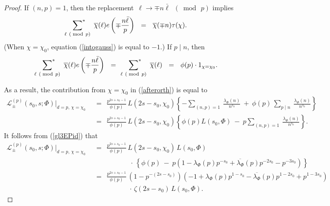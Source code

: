 \documentclass[10pt,a4paper]{amsart}
\begin{document}
\begin{proof}
	If $(n,p)=1$, then the replacement\,   $\ell \to \mp n\bar{\ell}$\, $(\bmod\, p)$ implies 
	\begin{align}\label{intogauss}
		\sideset{}{^*}{\sum}_{\ell \ (\bmod\, p)}  \ \overline{\chi}(\ell) 	e\left(\mp \frac{n\bar{\ell}}{p}\right) \ \ =  \ \  \overline{\chi}(\mp n) \tau(\chi). 
	\end{align}
 (When $\chi=\chi_{0}$, equation (\ref{intogauss}) is equal to $-1$.) If  $p\mid n$, then
	\begin{align*}
		\sideset{}{^*}{\sum}_{\ell \ (\bmod\, p)}  \ \overline{\chi}(\ell) 	e\left(\mp \frac{n\bar{\ell}}{p}\right) \ \ = \  \  	\sideset{}{^*}{\sum}_{\ell \ (\bmod\, p)}  \ \overline{\chi}(\ell)  \ \ = \ \  \phi(p)\cdot  1_{\chi=\chi_{0}}. 
	\end{align*}
	
	As a result, the contribution from $\chi=\chi_{0}$ in (\ref{afterorth}) is equal to 
	\begin{align}
			\mathcal{L}^{(p)}_{\pm}\left(s_{0}, s; \Phi\right) \bigg|_{d=p, \, \chi=\chi_{0}}   \ \ &= \  \   \frac{p^{2s+s_{0}-1}}{\phi(p)} \,  L(2s-s_{0}, \chi_{0})  \left\{ -\sum_{(n,p)=1} \ \frac{\lambda_{\Phi}(n)}{n^{s_{0}}}  \ + \ \phi(p) \, \sum_{p\mid n} \ \frac{\lambda_{\Phi}(n)}{n^{s_{0}}}   \right\} \nonumber\\
		\ \ &= \ \     \frac{p^{2s+s_{0}-1}}{\phi(p)} \,  L(2s-s_{0}, \chi_{0})  \left\{  \phi(p) L(s_{0}, \Phi) \ - \  p \sum_{(n,p)=1} \ \frac{\lambda_{\Phi}(n)}{n^{s_{0}}} \right\}. \nonumber
	\end{align}
	It follows from (\ref{gl3EPid}) that
	\begin{align}
			\mathcal{L}^{(p)}_{\pm}\left(s_{0}, s; \Phi\right) \bigg|_{d=p, \, \chi=\chi_{0}} 	\ \ &= \  \     \frac{p^{2s+s_{0}-1}}{\phi(p)} \,  L(2s-s_{0}, \chi_{0})  \, L(s_{0}, \Phi) \nonumber\\
		& \hspace{60pt} \,  \cdot \,  \left\{  \phi(p) \ - \  p   \left(1-\lambda_{\Phi}(p)p^{-s_{0}} +\overline{\lambda_{\Phi}}(p)p^{-2s_{0}}-p^{-3s_{0}}\right) \right\}  \nonumber\\
		\ \ &= \  \  \frac{p^{2s+s_{0}-1}}{\phi(p)} \, (1-p^{-(2s-s_{0})}) \left(-1 +\lambda_{\Phi}(p)p^{1-s_{0}}- \overline{\lambda_{\Phi}}(p) p^{1-2s_{0}}+p^{1-3s_{0}}\right) \nonumber\\
		&\hspace{60pt} \cdot \,  \zeta(2s-s_{0}) \, L(s_{0}, \Phi). \nonumber
	\end{align}
	

\end{proof}
\end{document}
